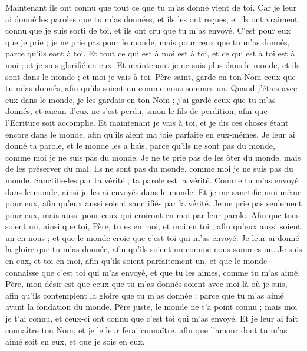 \begin{multicols}{2}
Maintenant ils ont connu que tout ce que tu m'as donné vient de toi.
Car je leur ai donné les paroles que tu m'as données, et ils les ont reçues, et ils ont vraiment connu que je suis sorti de toi, et ils ont cru que tu m'as envoyé.
C'est pour eux que je prie ; je ne prie pas pour le monde, mais pour ceux que tu m'as donnés, parce qu'ils sont à toi.
Et tout ce qui est à moi est à toi, et ce qui est à toi est à moi ; et je suis glorifié en eux.
Et maintenant je ne suis plus dans le monde, et ils sont dans le monde ; et moi je vais à toi. Père saint, garde en ton Nom ceux que tu m'as donnés, afin qu'ils soient un comme nous sommes un.
Quand j'étais avec eux dans le monde, je les gardais en ton Nom ; j'ai gardé ceux que tu m'as donnés, et aucun d'eux ne s'est perdu, sinon le fils de perdition, afin que l'Ecriture soit accomplie.
Et maintenant je vais à toi, et je dis ces choses étant encore dans le monde, afin qu'ils aient ma joie parfaite en eux-mêmes.
Je leur ai donné ta parole, et le monde les a haïs, parce qu'ils ne sont pas du monde, comme moi je ne suis pas du monde.
Je ne te prie pas de les ôter du monde, mais de les préserver du mal.
Ils ne sont pas du monde, comme moi je ne suis pas du monde.
Sanctifie-les par ta vérité ; ta parole est la vérité.
Comme tu m'as envoyé dans le monde, ainsi je les ai envoyés dans le monde.
Et je me sanctifie moi-même pour eux, afin qu'eux aussi soient sanctifiés par la vérité.
Je ne prie pas seulement pour eux, mais aussi pour ceux qui croiront en moi par leur parole.
Afin que tous soient un, ainsi que toi, Père, tu es en moi, et moi en toi ; afin qu'eux aussi soient un en nous ; et que le monde croie que c'est toi qui m'as envoyé.
Je leur ai donné la gloire que tu m'as donnée, afin qu'ils soient un comme nous sommes un.
Je suis en eux, et toi en moi, afin qu'ils soient parfaitement un, et que le monde connaisse que c'est toi qui m'as envoyé, et que tu les aimes, comme tu m'as aimé.
Père, mon désir est que ceux que tu m'as donnés soient avec moi là où je suis, afin qu'ils contemplent la gloire que tu m'as donnée ; parce que tu m'as aimé avant la fondation du monde.
Père juste, le monde ne t'a point connu ; mais moi je t'ai connu, et ceux-ci ont connu que c'est toi qui m'as envoyé.
Et je leur ai fait connaître ton Nom, et je le leur ferai connaître, afin que l'amour dont tu m'as aimé soit en eux, et que je sois en eux.

\end{multicols}
